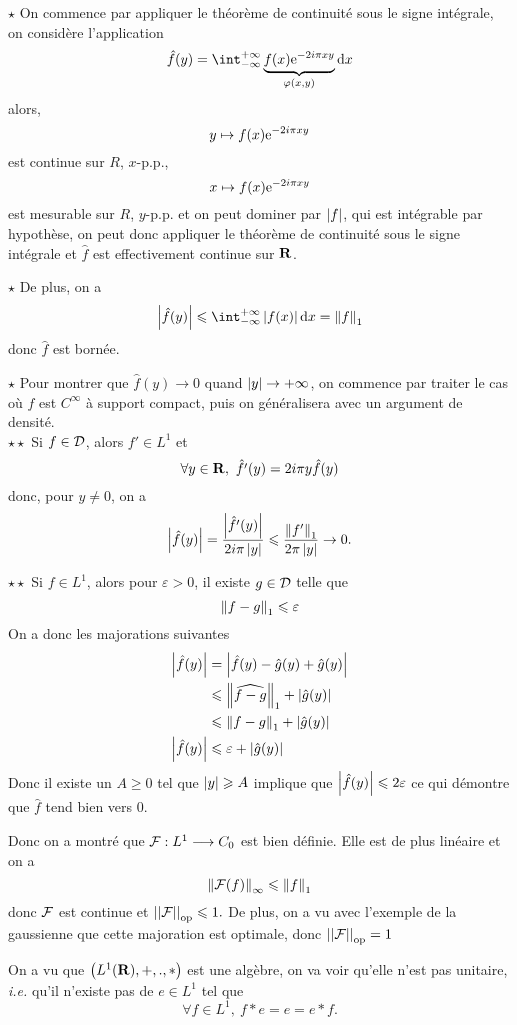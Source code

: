 \documentclass[a4paper,11pt, twoside]{article}
\begin{document}
\begin{Proof}
  $\star$ On commence par appliquer le théorème de continuité sous le signe intégrale, on considère l'application 
  $$\hat f(y)=\intr \underbrace{f(x)\ex{-2i\pi xy}}_{\varphi(x,y)}\dx$$
  alors, 
  $$y\mapsto f(x)\mathrm{e}^{-2i\pi xy}$$
  est continue sur $R$, $x$-p.p.,
  $$x\mapsto f(x)\mathrm{e}^{-2i\pi xy}$$
  est mesurable sur $R$, $y$-p.p. et on peut dominer par $\left| f\right|$, qui est intégrable par hypothèse, on peut donc appliquer le théorème de continuité sous le signe intégrale et $\hat f$ est effectivement continue sur $\mathbf R$.

  $\star$ De plus, on a 
  $$\abs{\hat f(y)}\leqslant \intr\abs{f(x)}\dx=\norm{f}_1$$
  donc $\hat f$ est bornée.

  $\star$ Pour montrer que $\hat f(y)\to 0$ quand $\left| y\right|\to+\infty$, on commence par traiter le cas où $f$ est $C^{\infty}$ à support compact, puis on généralisera avec un argument de densité.\\
  $\star\star$ Si $f\in \mathcal D$, alors $f'\in L^1$ et 
  $$\forall y\in\mathbf R,\ \hat{f'}(y)=2i\pi y\hat f(y)$$
  donc, pour $y\neq 0$, on a 
  $$\left| \hat f(y)\right|=\frac{\left| \hat{f'}(y)\right|}{2i\pi\left| y\right|}\leqslant \frac{\left\lVert f'\right\rVert_1}{2\pi\left| y\right|}\to 0.$$

  $\star\star$ Si $f\in L^1$, alors pour $\varepsilon>0$, il existe $g\in\mathcal D$ telle que 
  $$\left\lVert f-g\right\rVert_1\leqslant \varepsilon$$
  On a donc les majorations suivantes 
  \begin{align*}
    \left| \hat f(y)\right|&=\left| \hat f(y)-\hat g(y)+\hat g(y)\right|\\
    &\leqslant\left\lVert\widehat{f-g}\right\rVert_1+\left| \hat g(y)\right|\\
    &\leqslant\left\lVert f-g\right\rVert_1+\left| \hat g(y)\right|\\
    \left| \hat f(y)\right|&\leqslant \varepsilon+\left| \hat g(y)\right|
  \end{align*}
  Donc il existe un $A\geqslant 0$ tel que $\left| y\right|\geqslant A$ implique que $\left| \hat f(y)\right|\leqslant 2\varepsilon$ ce qui démontre que $\hat f$ tend bien vers 0.

  Donc on a montré que $\mathcal F:L^1\longrightarrow C_0$ est bien définie. Elle est de plus linéaire et on a 
  $$\left\lVert\mathcal F(f)\right\rVert_\infty\leqslant\left\lVert f\right\rVert_1$$
  donc $\mathcal F$ est continue et $\left|\left|\mathcal F\right|\right|_{\mathrm{op}}\leqslant 1.$ De plus, on a vu avec l'exemple de la gaussienne que cette majoration est optimale, donc $\left|\left|\mathcal F\right|\right|_{\mathrm{op}} =1$
\end{Proof}


On a vu que $\left(L^1(\mathbf R),+,.,*\right)$ est une algèbre, on va voir qu'elle n'est pas unitaire, \emph{i.e.} qu'il n'existe pas de $e\in L^1$ tel que 
$$\forall f\in L^1,\ f*e=e=e*f.$$
\end{document}
